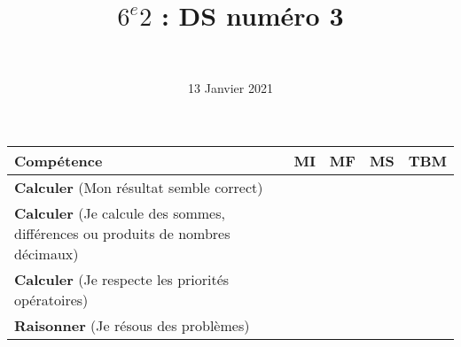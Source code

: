 \documentclass[a4paper,11pt]{exam}
\author{\ }
\date{13 Janvier 2021}
\title{$6^e 2$ : DS num\'ero 3}
\begin{document}
%	

	\maketitle
	

\begin{small}
	\begin{center}
		\begin{tabular}{|@{\ }l@{\ }|@{\ }c@{\ }|@{\ }c@{\ }|@{\ }c@{\ }|@{\ }c@{\ }|}
			\hline
			\textbf{Compétence} & \textbf{MI} & \textbf{MF} & \textbf{MS} & \textbf{TBM} \\
			\hline
			\textbf{Calculer} (Mon résultat semble correct) &  \ \ & \ \ & \ \ & \ \  \\
			\hline
			\textbf{Calculer} (Je calcule des sommes, différences ou produits de nombres décimaux)&  \ \ & \ \ & \ \ & \ \  \\
			\hline
			\textbf{Calculer} (Je respecte les priorités opératoires)&  \ \ & \ \ & \ \ & \ \  \\
			\hline	
			\textbf{Raisonner} (Je résous des problèmes) & \ \ & \ \ &  \ \  & \ \ \\
			\hline
%			 
		\end{tabular}
	\end{center}
\end{small}	

	
	
%	





\newpage


%

%



%

%


\newpage





\label{LastPage}

%
\end{document}
